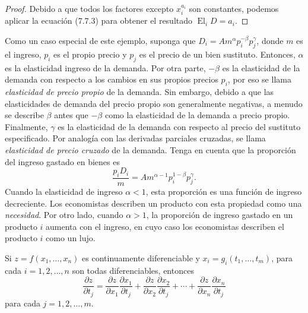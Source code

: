 \begin{proof}
Debido a que todos los factores excepto $x^{a_{i}}_{i}$ son constantes, podemos aplicar la ecuación (7.7.3) para obtener el resultado $\operatorname{El}_{i}D=a_{i}$.
\end{proof}

Como un caso especial de este ejemplo, suponga que $D_{i}=Am^{\alpha}p^{-\beta}_{i}p^{\gamma}_{j}$, donde $m$ es el ingreso, $p_{i}$ es el propio precio y  $p_{j}$ es el precio de un bien sustituto. Entonces, $\alpha$ es la elasticidad ingreso de la demanda. Por otra parte, $-\beta$ es la elasticidad de la demanda con respecto a los cambios en sus propios precios $p_{i}$, por eso se llama \emph{elasticidad de precio propio} de la demanda. Sin embargo, debido a que las elasticidades de demanda del precio propio son generalmente negativas, a menudo se describe $\beta$ antes que $-\beta$ como la elasticidad de la demanda a precio propio. Finalmente, $\gamma$ es la elasticidad de la demanda con respecto al precio del sustituto especificado. Por analogía con las derivadas parciales cruzadas, se llama \emph{elasticidad de precio cruzado} de la demanda. Tenga en cuenta que la proporción del ingreso gastado en bienes es \[ \frac{p_{i}D_{i}}{m}=Am^{\alpha-1}p^{1-\beta}_{i}p^{\gamma}_{j}. \] Cuando la elasticidad de ingreso $\alpha<1$, esta proporción es una función de ingreso decreciente. Los economistas describen un producto con esta propiedad como una \emph{necesidad}. Por otro lado, cuando $\alpha>1$, la proporción de ingreso gastado en un producto $i$ aumenta con el ingreso, en cuyo caso los economistas describen el producto $i$ como un lujo.

\begin{remark}
Si $z=f\left(x_{1},\ldots,x_{n}\right)$ es continuamente diferenciable y $x_{i}=g_{i}\left(t_{1},\ldots,t_{m}\right)$, para cada $i=1,2,\ldots,n$ son todas diferenciables, entonces \[ \frac{\partial z}{\partial t_{j}}=\frac{\partial z}{\partial x_{1}}\frac{\partial x_{1}}{\partial t_{j}}+\frac{\partial z}{\partial x_{2}}\frac{\partial x_{2}}{\partial t_{j}}+\cdots+\frac{\partial z}{\partial x_{n}}\frac{\partial x_{n}}{\partial t_{j}} \] para cada $j=1,2,\ldots,m$.
\end{remark}


